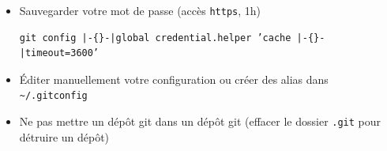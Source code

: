 \documentclass[table,tikz,12pt,svgnames]{beamer}
\begin{document}
\begin{frame}[fragile]
\begin{block}{}
\begin{itemize}
\item Sauvegarder votre mot de passe (accès \texttt{https}, 1h)
\begin{adjustwidth}{-3em}{0cm}
\begin{verbatim}
git config |-{}-|global credential.helper ’cache |-{}-|timeout=3600’
\end{verbatim}
\end{adjustwidth}
\item Éditer manuellement votre configuration ou créer des alias dans \texttt{\textasciitilde/.gitconfig}
\item Ne pas mettre un dépôt git dans un dépôt git (effacer le dossier \texttt{.git} pour détruire un dépôt)
\end{itemize}
\end{block}
\end{frame}
\end{document}
